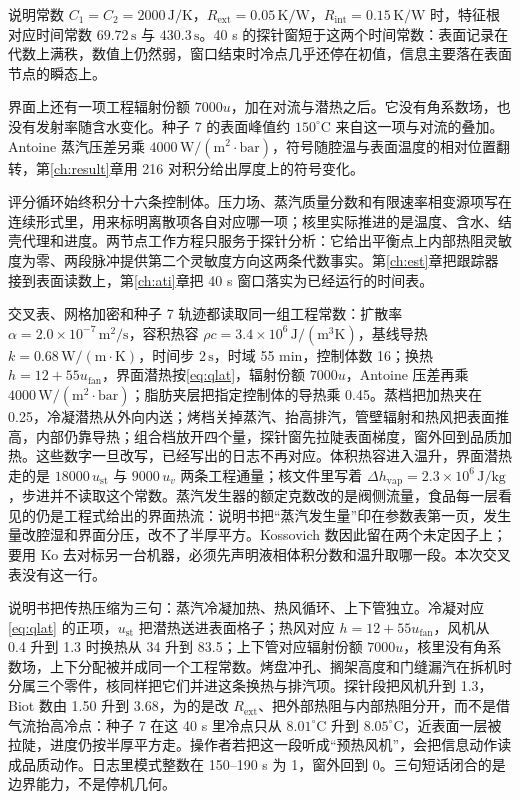 说明常数 \(C_1=C_2=2000\,\mathrm{J/K}\)，\(R_{\mathrm{ext}}=0.05\,\mathrm{K/W}\)，\(R_{\mathrm{int}}=0.15\,\mathrm{K/W}\) 时，特征根对应时间常数 \(69.72\,\mathrm{s}\) 与 \(430.3\,\mathrm{s}\)。40 s 的探针窗短于这两个时间常数：表面记录在代数上满秩，数值上仍然弱，窗口结束时冷点几乎还停在初值，信息主要落在表面节点的瞬态上。

界面上还有一项工程辐射份额 \(7000u\)，加在对流与潜热之后。它没有角系数场，也没有发射率随含水变化。种子 7 的表面峰值约 \(150^\circ\mathrm{C}\) 来自这一项与对流的叠加。Antoine 蒸汽压差另乘 \(4000\,\mathrm{W}/(\mathrm{m}^2\cdot\mathrm{bar})\)，符号随腔温与表面温度的相对位置翻转，第\ref{ch:result}章用 216 对积分给出厚度上的符号变化。

评分循环始终积分十六条控制体。压力场、蒸汽质量分数和有限速率相变源项写在连续形式里，用来标明离散项各自对应哪一项；核里实际推进的是温度、含水、结壳代理和进度。两节点工作方程只服务于探针分析：它给出平衡点上内部热阻灵敏度为零、两段脉冲提供第二个灵敏度方向这两条代数事实。第\ref{ch:est}章把跟踪器接到表面读数上，第\ref{ch:ati}章把 40 s 窗口落实为已经运行的时间表。

交叉表、网格加密和种子 7 轨迹都读取同一组工程常数：扩散率 \(\alpha=2.0\times 10^{-7}\,\mathrm{m}^2/\mathrm{s}\)，容积热容 \(\rho c=3.4\times 10^{6}\,\mathrm{J}/(\mathrm{m}^3\mathrm{K})\)，基线导热 \(k=0.68\,\mathrm{W}/(\mathrm{m\cdot K})\)，时间步 \(2\,\mathrm{s}\)，时域 55 min，控制体数 16；换热 \(h=12+55u_{\mathrm{fan}}\)，界面潜热按\eqref{eq:qlat}，辐射份额 \(7000u\)，Antoine 压差再乘 \(4000\,\mathrm{W}/(\mathrm{m}^2\cdot\mathrm{bar})\)；脂肪夹层把指定控制体的导热乘 0.45。蒸档把加热夹在 0.25，冷凝潜热从外向内送；烤档关掉蒸汽、抬高排汽，管壁辐射和热风把表面推高，内部仍靠导热；组合档放开四个量，探针窗先拉陡表面梯度，窗外回到品质加热。这些数字一旦改写，已经写出的日志不再对应。体积热容进入温升，界面潜热走的是 \(18000\,u_{\mathrm{st}}\) 与 \(9000\,u_v\) 两条工程通量；核文件里写着 \(\Delta h_{\mathrm{vap}}=2.3\times 10^{6}\,\mathrm{J/kg}\)，步进并不读取这个常数。蒸汽发生器的额定克数改的是阀侧流量，食品每一层看见的仍是工程式给出的界面热流：说明书把“蒸汽发生量”印在参数表第一页，发生量改腔湿和界面分压，改不了半厚平方。Kossovich 数因此留在两个未定因子上；要用 Ko 去对标另一台机器，必须先声明液相体积分数和温升取哪一段。本次交叉表没有这一行。

说明书把传热压缩为三句：蒸汽冷凝加热、热风循环、上下管独立。冷凝对应\eqref{eq:qlat} 的正项，\(u_{\mathrm{st}}\) 把潜热送进表面格子；热风对应 \(h=12+55u_{\mathrm{fan}}\)，风机从 0.4 升到 1.3 时换热从 34 升到 83.5；上下管对应辐射份额 \(7000u\)，核里没有角系数场，上下分配被并成同一个工程常数。烤盘冲孔、搁架高度和门缝漏汽在拆机时分属三个零件，核同样把它们并进这条换热与排汽项。探针段把风机升到 1.3，Biot 数由 1.50 升到 3.68，为的是改 \(R_{\mathrm{ext}}\)、把外部热阻与内部热阻分开，而不是借气流抬高冷点：种子 7 在这 40 s 里冷点只从 \(8.01^\circ\mathrm{C}\) 升到 \(8.05^\circ\mathrm{C}\)，近表面一层被拉陡，进度仍按半厚平方走。操作者若把这一段听成“预热风机”，会把信息动作读成品质动作。日志里模式整数在 150--190 s 为 1，窗外回到 0。三句短话闭合的是边界能力，不是停机几何。

